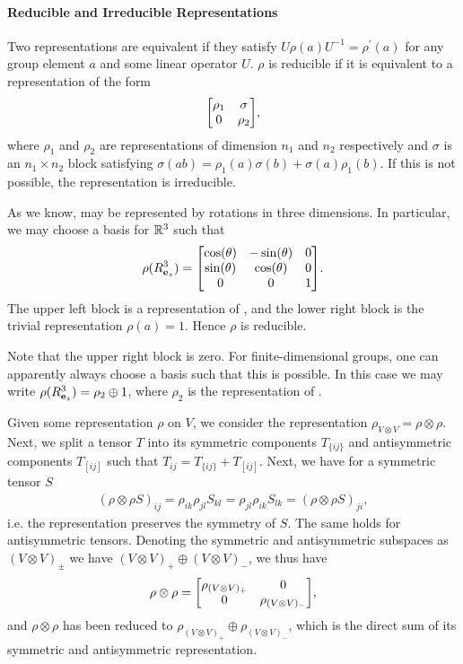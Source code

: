 \paragraph{Reducible and Irreducible Representations}
Two representations are equivalent if they satisfy $U\rho(a)U^{-1} = \rho^{\prime}(a)$ for any group element $a$ and some linear operator $U$. $\rho$ is reducible if it is equivalent to a representation of the form
\begin{align*}
	\mqty[
		\rho_{1} & \sigma \\
		0        & \rho_{2}
	],
\end{align*}
where $\rho_{1}$ and $\rho_{2}$ are representations of dimension $n_{1}$ and $n_{2}$ respectively and $\sigma$ is an $n_{1}\times n_{2}$ block satisfying $\sigma(ab) = \rho_{1}(a)\sigma(b) + \sigma(a)\rho_{1}(b)$. If this is not possible, the representation is irreducible.

As we know,  may be represented by rotations in three dimensions. In particular, we may choose a basis for $\mathbb{R}^{3}$ such that
\begin{align*}
	\rho(R_{\vb{e}_{z}}^{3}) = 
	\mqty[
		\cos(\theta) & -\sin(\theta) & 0 \\
		\sin(\theta) & \cos(\theta)  & 0 \\
		0            & 0             & 1
	].
\end{align*}
The upper left block is a representation of , and the lower right block is the trivial representation $\rho(a) = 1$. Hence $\rho$ is reducible.

Note that the upper right block is zero. For finite-dimensional groups, one can apparently always choose a basis such that this is possible. In this case we may write $\rho(R_{\vb{e}_{z}}^{3}) = \rho_{2}\oplus 1$, where $\rho_{2}$ is the representation of .

Given some representation $\rho$ on $V$, we consider the representation $\rho_{V\otimes V} = \rho\otimes\rho$. Next, we split a tensor $T$ into its symmetric components $T_{\{ij\}}$ and antisymmetric components $T_[ij]$ such that $T_{ij} = T_{\{ij\}} + T_[ij]$. Next, we have for a symmetric tensor $S$
\begin{align*}
	(\rho\otimes\rho S)_{ij} = \rho_{ik}\rho_{jl}S_{kl} = \rho_{jl}\rho_{ik}S_{lk} = (\rho\otimes\rho S)_{ji},
\end{align*}
i.e. the representation preserves the symmetry of $S$. The same holds for antisymmetric tensors. Denoting the symmetric and antisymmetric subspaces as $(V\otimes V)_{\pm}$ we have $(V\otimes V)_{+}\oplus(V\otimes V)_{-}$, we thus have
\begin{align*}
	\rho\otimes\rho =
	\mqty[
		\rho_{(V\otimes V)_{+}} & 0 \\
		0                       & \rho_{(V\otimes V)_{-}}
	],
\end{align*}
and $\rho\otimes\rho$ has been reduced to $\rho_{(V\otimes V)_{+}}\oplus\rho_{(V\otimes V)_{-}}$, which is the direct sum of its symmetric and antisymmetric representation.